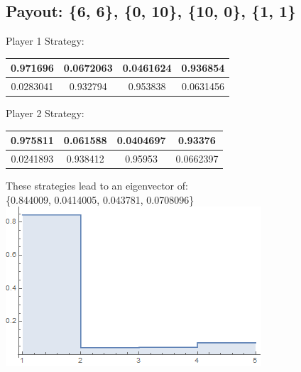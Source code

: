 \documentclass{Article}
\begin{document}
\subsection{Payout: \{6, 6\}, \{0, 10\}, \{10, 0\}, \{1, 1\}}
\begin{center}
Player 1 Strategy: 
  \begin{tabular}{c | c | c | c }
    0.971696 & 0.0672063 & 0.0461624 & 0.936854 \\ \hline
    0.0283041 & 0.932794 & 0.953838 & 0.0631456 \\ \hline
  \end{tabular}
\end{center}
\begin{center}
Player 2 Strategy: 
  \begin{tabular}{c | c | c | c }
    0.975811 & 0.061588 & 0.0404697 & 0.93376 \\ \hline
    0.0241893 & 0.938412 & 0.95953 & 0.0662397 \\ \hline
  \end{tabular}
\end{center}
\begin{center}
These strategies lead to an eigenvector of:\\
\{0.844009, 0.0414005, 0.043781, 0.0708096\}\\
\includegraphics[scale=0.5]{sixsix.png}
\end{center}
\end{document}
